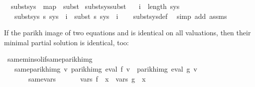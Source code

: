 \begin{isabellebody}
\ \ {\isachardoublequoteopen}subst{\isacharunderscore}{\kern0pt}sys\ {\isasymequiv}\ map\ {\isasymcirc}\ subst{\isachardoublequoteclose}\isanewline
\isanewline
{}\isamarkupfalse%
\ subst{\isacharunderscore}{\kern0pt}sys{\isacharunderscore}{\kern0pt}subst{\isacharcolon}{\kern0pt}\isanewline
\ \ \ {\isachardoublequoteopen}i\ {\isacharless}{\kern0pt}\ length\ sys{\isachardoublequoteclose}\isanewline
\ \ \ {\isachardoublequoteopen}{\isacharparenleft}{\kern0pt}subst{\isacharunderscore}{\kern0pt}sys\ s\ sys{\isacharparenright}{\kern0pt}\ {\isacharbang}{\kern0pt}\ i\ {\isacharequal}{\kern0pt}\ subst\ s\ {\isacharparenleft}{\kern0pt}sys\ {\isacharbang}{\kern0pt}\ i{\isacharparenright}{\kern0pt}{\isachardoublequoteclose}\isanewline
%
\isadelimproof
\ \ %
\endisadelimproof
%
\isatagproof
{}\isamarkupfalse%
\ subst{\isacharunderscore}{\kern0pt}sys{\isacharunderscore}{\kern0pt}def\ \isamarkupfalse%
\ {\isacharparenleft}{\kern0pt}simp\ add{\isacharcolon}{\kern0pt}\ assms{\isacharparenright}{\kern0pt}%
\endisatagproof
{\isafoldproof}%
%
\isadelimproof
%
\endisadelimproof
%
\begin{isamarkuptext}%
If the parikh image of two equations  and  is identical on all valuations, then their
minimal partial solution is identical, too:%
\end{isamarkuptext}\isamarkuptrue%
\isamarkupfalse%
\ same{\isacharunderscore}{\kern0pt}min{\isacharunderscore}{\kern0pt}sol{\isacharunderscore}{\kern0pt}if{\isacharunderscore}{\kern0pt}same{\isacharunderscore}{\kern0pt}parikh{\isacharunderscore}{\kern0pt}img{\isacharcolon}{\kern0pt}\isanewline
\ \ \ same{\isacharunderscore}{\kern0pt}parikh{\isacharunderscore}{\kern0pt}img{\isacharcolon}{\kern0pt}\ {\isachardoublequoteopen}{\isasymforall}v{\isachardot}{\kern0pt}\ parikh{\isacharunderscore}{\kern0pt}img\ {\isacharparenleft}{\kern0pt}eval\ f\ v{\isacharparenright}{\kern0pt}\ {\isacharequal}{\kern0pt}\ parikh{\isacharunderscore}{\kern0pt}img\ {\isacharparenleft}{\kern0pt}eval\ g\ v{\isacharparenright}{\kern0pt}{\isachardoublequoteclose}\isanewline
\ \ \ \ \ \ \ same{\isacharunderscore}{\kern0pt}vars{\isacharcolon}{\kern0pt}\ \ \ \ \ \ \ {\isachardoublequoteopen}vars\ f\ {\isacharminus}{\kern0pt}\ {\isacharbraceleft}{\kern0pt}x{\isacharbraceright}{\kern0pt}\ {\isacharequal}{\kern0pt}\ vars\ g\ {\isacharminus}{\kern0pt}\ {\isacharbraceleft}{\kern0pt}x{\isacharbraceright}{\kern0pt}{\isachardoublequoteclose}\isanewline

\end{isabellebody}
